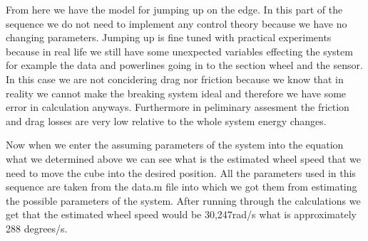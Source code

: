 From here we have the model for jumping up on the edge.
In this part of the sequence we do not need to implement any control theory because we have no changing parameters.
Jumping up is fine tuned with practical experiments because in real life we still have some unexpected variables effecting the system for example the data and powerlines going in to the section wheel and the sensor.
In this case we are not concidering drag nor friction because we know that in reality we cannot make the breaking system ideal and therefore we have some error in calculation anyways.
Furthermore in peliminary assesment the friction and drag losses are very low relative to the whole system energy changes.

Now when we enter the assuming parameters of the system into the equation what we determined above we can see what is the estimated wheel speed that we need to move the cube into the desired position.
All the parameters used in this sequence are taken from the data.m file into which we got them from estimating the possible parameters of the system.
After running through the calculations we get that the estimated wheel speed would be 30,247rad/s what is approximately 288 degrees/s.


